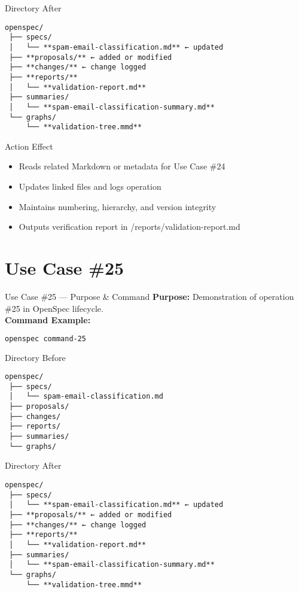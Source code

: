 \documentclass[aspectratio=169]{beamer}
\begin{document}
\begin{frame}{Directory After}
\begin{lstlisting}
openspec/
 ├── specs/
 │   └── **spam-email-classification.md** ← updated
 ├── **proposals/** ← added or modified
 ├── **changes/** ← change logged
 ├── **reports/**
 │   └── **validation-report.md**
 ├── summaries/
 │   └── **spam-email-classification-summary.md**
 └── graphs/
     └── **validation-tree.mmd**
\end{lstlisting}
\end{frame}

\begin{frame}{Action Effect}
\begin{itemize}
  \item Reads related Markdown or metadata for Use Case \#24
  \item Updates linked files and logs operation
  \item Maintains numbering, hierarchy, and version integrity
  \item Outputs verification report in /reports/validation-report.md
\end{itemize}
\end{frame}

\section*{Use Case \#25}
\begin{frame}{Use Case \#25 --- Purpose \& Command}
\textbf{Purpose:} Demonstration of operation \#25 in OpenSpec lifecycle.\\[4pt]
\textbf{Command Example:}
\begin{lstlisting}[language=bash]
openspec command-25
\end{lstlisting}
\end{frame}

\begin{frame}{Directory Before}
\begin{lstlisting}
openspec/
 ├── specs/
 │   └── spam-email-classification.md
 ├── proposals/
 ├── changes/
 ├── reports/
 ├── summaries/
 └── graphs/
\end{lstlisting}
\end{frame}

\begin{frame}{Directory After}
\begin{lstlisting}
openspec/
 ├── specs/
 │   └── **spam-email-classification.md** ← updated
 ├── **proposals/** ← added or modified
 ├── **changes/** ← change logged
 ├── **reports/**
 │   └── **validation-report.md**
 ├── summaries/
 │   └── **spam-email-classification-summary.md**
 └── graphs/
     └── **validation-tree.mmd**
\end{lstlisting}
\end{frame}
\end{document}
